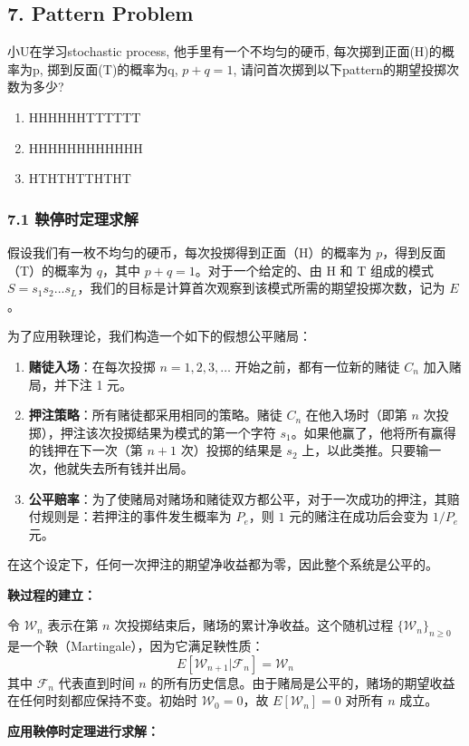 \documentclass[UTF8]{ctexart}
\begin{document}
\subsection*{7. Pattern Problem}
小U在学习stochastic process, 他手里有一个不均匀的硬币, 每次掷到正面(H)的概率为p, 掷到反面(T)的概率为q, $p+q=1$, 请问首次掷到以下pattern的期望投掷次数为多少?
\begin{enumerate}
    \item HHHHHHTTTTTT
    \item HHHHHHHHHHHH
    \item HTHTHTTHTHT
\end{enumerate}

\subsubsection*{7.1 鞅停时定理求解}
假设我们有一枚不均匀的硬币，每次投掷得到正面（H）的概率为 $p$，得到反面（T）的概率为 $q$，其中 $p+q=1$。对于一个给定的、由 H 和 T 组成的模式 $S = s_1s_2...s_L$，我们的目标是计算首次观察到该模式所需的期望投掷次数，记为 $E$。

为了应用鞅理论，我们构造一个如下的假想公平赌局：
\begin{enumerate}
    \item \textbf{赌徒入场}：在每次投掷 $n=1, 2, 3, \dots$ 开始之前，都有一位新的赌徒 $C_n$ 加入赌局，并下注 1 元。
    \item \textbf{押注策略}：所有赌徒都采用相同的策略。赌徒 $C_n$ 在他入场时（即第 $n$ 次投掷），押注该次投掷结果为模式的第一个字符 $s_1$。如果他赢了，他将所有赢得的钱押在下一次（第 $n+1$ 次）投掷的结果是 $s_2$ 上，以此类推。只要输一次，他就失去所有钱并出局。
    \item \textbf{公平赔率}：为了使赌局对赌场和赌徒双方都公平，对于一次成功的押注，其赔付规则是：若押注的事件发生概率为 $P_e$，则 $1$ 元的赌注在成功后会变为 $1/P_e$ 元。
\end{enumerate}
在这个设定下，任何一次押注的期望净收益都为零，因此整个系统是公平的。


\textbf{鞅过程的建立：}

令 $\mathcal{W}_n$ 表示在第 $n$ 次投掷结束后，赌场的累计净收益。这个随机过程 $\{\mathcal{W}_n\}_{n \ge 0}$ 是一个鞅（Martingale），因为它满足鞅性质：
$$ E[\mathcal{W}_{n+1} | \mathcal{F}_n] = \mathcal{W}_n $$
其中 $\mathcal{F}_n$ 代表直到时间 $n$ 的所有历史信息。由于赌局是公平的，赌场的期望收益在任何时刻都应保持不变。初始时 $\mathcal{W}_0 = 0$，故 $E[\mathcal{W}_n] = 0$ 对所有 $n$ 成立。

\textbf{应用鞅停时定理进行求解：}
\end{document}
